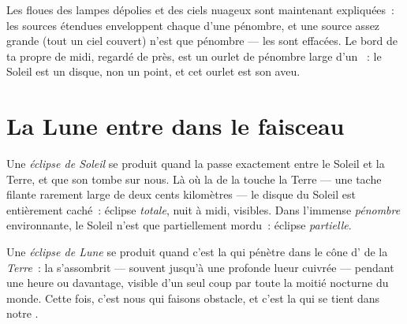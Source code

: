\begin{example}\label{ex:g7:shadows-eclipses:soft}
Les  floues des lampes dépolies et des ciels nuageux sont
maintenant expliquées~: les sources étendues enveloppent chaque 
d'une pénombre, et une source assez grande (tout un ciel couvert)
n'est que pénombre --- les  sont effacées. Le bord de ta propre
 de midi, regardé de près, est un ourlet de pénombre large d'un
~: le Soleil est un disque, non un point, et cet ourlet est
son aveu.
\end{example}

\section{La Lune entre dans le faisceau}

\begin{definition}\label{def:g7:shadows-eclipses:solar}
Une \emph{éclipse de Soleil} se produit
quand la  passe exactement entre le Soleil et la Terre, et que
son  tombe sur nous. Là où la \emph{} de la 
touche la Terre --- une tache filante rarement large de deux cents
kilomètres --- le disque du Soleil est entièrement caché~: éclipse
\emph{totale}, nuit à midi,  visibles. Dans l'immense
\emph{pénombre} environnante, le Soleil n'est que partiellement
mordu~: éclipse \emph{partielle}.
\end{definition}

\begin{definition}\label{def:g7:shadows-eclipses:lunar}
Une \emph{éclipse de Lune} se produit quand
c'est la \emph{} qui pénètre dans le cône d' de la
\emph{Terre}~: la  s'assombrit --- souvent jusqu'à une
profonde lueur cuivrée --- pendant une heure ou davantage, visible
d'un seul coup par toute la moitié nocturne du monde. Cette fois,
c'est nous qui faisons obstacle, et c'est la  qui se tient dans
notre .
\end{definition}

